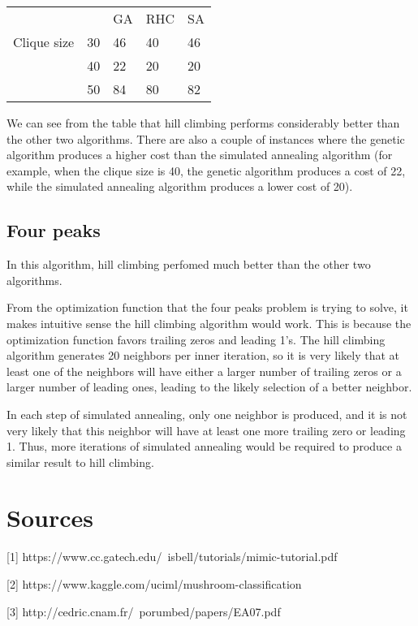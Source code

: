 \documentclass[11pt]{article}
\begin{document}
            \begin{tabular}{lllll}
                        &    & GA & RHC & SA \\
            Clique size & 30 & 46 & 40  & 46 \\
                        & 40 & 22 & 20  & 20 \\
                        & 50 & 84 & 80  & 82
            \end{tabular}
       
        We can see from the table that hill climbing performs considerably better than the other two algorithms.
        There are also a couple of instances where the genetic algorithm produces a higher cost than the simulated
        annealing algorithm (for example, when the clique size is 40, the genetic algorithm produces
        a cost of 22, while the simulated annealing algorithm produces a lower cost of 20).

        \subsection{Four peaks}

        In this algorithm, hill climbing perfomed much better than the other two algorithms.

        From the optimization function that the four peaks problem is trying to solve, it makes
        intuitive sense the hill climbing algorithm would work. This is because the optimization
        function favors trailing zeros and leading 1's. The hill climbing algorithm generates 20
        neighbors per inner iteration, so it is very likely that at least one of the neighbors will
        have either a larger number of trailing zeros or a larger number of leading ones, leading
        to the likely selection of a better neighbor.

        In each step of simulated annealing, only one neighbor is produced, and it is not very likely that this
        neighbor will have at least one more trailing zero or leading 1. Thus, more iterations of simulated annealing
        would be required to produce a similar result to hill climbing.
        \section{Sources}

        [1] https://www.cc.gatech.edu/~isbell/tutorials/mimic-tutorial.pdf

        [2] https://www.kaggle.com/uciml/mushroom-classification

        [3] http://cedric.cnam.fr/~porumbed/papers/EA07.pdf

    
\end{document}
